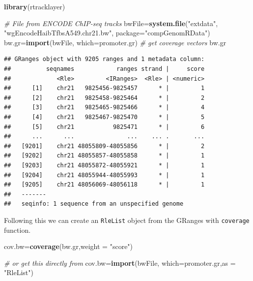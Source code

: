\documentclass[12pt,]{krantz}
\newenvironment{Shaded}{\begin{snugshade}}{\end{snugshade}}
\newcommand{\CommentTok}[1]{\textcolor[rgb]{0.56,0.35,0.01}{\textit{#1}}}
\newcommand{\DataTypeTok}[1]{\textcolor[rgb]{0.13,0.29,0.53}{#1}}
\newcommand{\KeywordTok}[1]{\textcolor[rgb]{0.13,0.29,0.53}{\textbf{#1}}}
\newcommand{\NormalTok}[1]{#1}
\newcommand{\StringTok}[1]{\textcolor[rgb]{0.31,0.60,0.02}{#1}}
\begin{document}
\begin{Shaded}
\begin{Highlighting}[]
\KeywordTok{library}\NormalTok{(rtracklayer)}

\CommentTok{# File from ENCODE ChIP-seq tracks}
\NormalTok{bwFile=}\KeywordTok{system.file}\NormalTok{(}\StringTok{"extdata"}\NormalTok{,}
                      \StringTok{"wgEncodeHaibTfbsA549.chr21.bw"}\NormalTok{,}
                      \DataTypeTok{package=}\StringTok{"compGenomRData"}\NormalTok{)}
\NormalTok{bw.gr=}\KeywordTok{import}\NormalTok{(bwFile, }\DataTypeTok{which=}\NormalTok{promoter.gr) }\CommentTok{# get coverage vectors}
\NormalTok{bw.gr}
\end{Highlighting}
\end{Shaded}

\begin{verbatim}
## GRanges object with 9205 ranges and 1 metadata column:
##          seqnames            ranges strand |     score
##             <Rle>         <IRanges>  <Rle> | <numeric>
##      [1]    chr21   9825456-9825457      * |         1
##      [2]    chr21   9825458-9825464      * |         2
##      [3]    chr21   9825465-9825466      * |         4
##      [4]    chr21   9825467-9825470      * |         5
##      [5]    chr21           9825471      * |         6
##      ...      ...               ...    ... .       ...
##   [9201]    chr21 48055809-48055856      * |         2
##   [9202]    chr21 48055857-48055858      * |         1
##   [9203]    chr21 48055872-48055921      * |         1
##   [9204]    chr21 48055944-48055993      * |         1
##   [9205]    chr21 48056069-48056118      * |         1
##   -------
##   seqinfo: 1 sequence from an unspecified genome
\end{verbatim}

Following this we can create an \texttt{RleList} object from the GRanges with \texttt{coverage}
function.

\begin{Shaded}
\begin{Highlighting}[]
\NormalTok{cov.bw=}\KeywordTok{coverage}\NormalTok{(bw.gr,}\DataTypeTok{weight =} \StringTok{"score"}\NormalTok{)}

\CommentTok{# or get this directly from}
\NormalTok{cov.bw=}\KeywordTok{import}\NormalTok{(bwFile, }\DataTypeTok{which=}\NormalTok{promoter.gr,}\DataTypeTok{as =} \StringTok{"RleList"}\NormalTok{)}
\end{Highlighting}
\end{Shaded}
\end{document}
